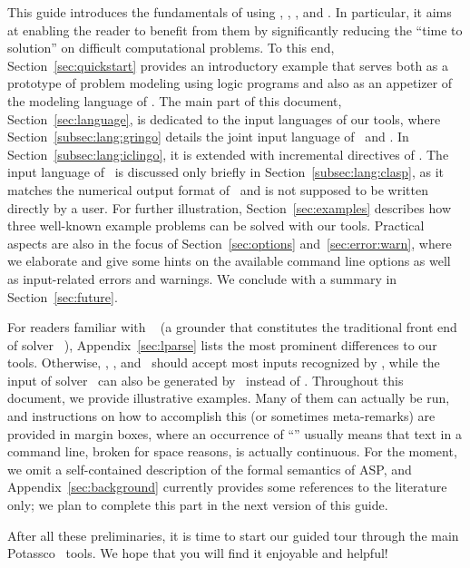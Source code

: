 This guide introduces the fundamentals of using
\gringo, \clasp, \clingo, and \iclingo.
In particular, it aims at enabling the reader to benefit from them
by significantly reducing the ``time to solution'' on difficult computational problems.
To this end,
Section~\ref{sec:quickstart}
provides an introductory example 
that serves both as a prototype of problem modeling using logic programs
and also as an appetizer of the modeling language of \gringo.
The main part of this document, Section~\ref{sec:language},
is dedicated to the input languages of our tools,
where Section~\ref{subsec:lang:gringo}
details the joint input language of \gringo\ and \clingo.
In Section~\ref{subsec:lang:iclingo}, it is extended with
incremental directives of \iclingo.
The input language of \clasp\ is discussed only briefly in Section~\ref{subsec:lang:clasp},
as it matches the numerical output format of \gringo\ and
is not supposed to be written directly by a user.
For %
further illustration,
Section~\ref{sec:examples} describes how three well-known example problems
can be solved with our tools.
Practical aspects are also in the focus of Section~\ref{sec:options} and~\ref{sec:error:warn},
where we elaborate and give some hints on the available command line options
as well as input-related errors and warnings. %
We conclude with a summary in Section~\ref{sec:future}.


For readers familiar with \lparse~\cite{lparseManual}
(a grounder that constitutes the traditional front end of solver \smodels~\cite{siniso02a}),
Appendix~\ref{sec:lparse}
lists the most prominent differences to our tools.
Otherwise, \gringo, \clingo, and \iclingo\ should accept most inputs recognized by \lparse,
while the input of solver \clasp\ can also be generated by \lparse\ instead of \gringo.
Throughout this document, we provide illustrative examples.
Many of them can actually be run, and instructions on how to accomplish this
(or sometimes meta-remarks)
are provided in margin boxes, where an occurrence of ``''
usually means that text in a command line, broken for space reasons, is actually continuous.
For the moment,
we omit a self-contained description of the formal semantics of ASP,
and Appendix~\ref{sec:background} currently provides some references
to the literature only; we plan to complete this part in the next version
of this guide.

After all these preliminaries, it is time to start our guided tour
through the main Potassco~\cite{potassco} tools.
We hope that you will find it enjoyable and helpful!

